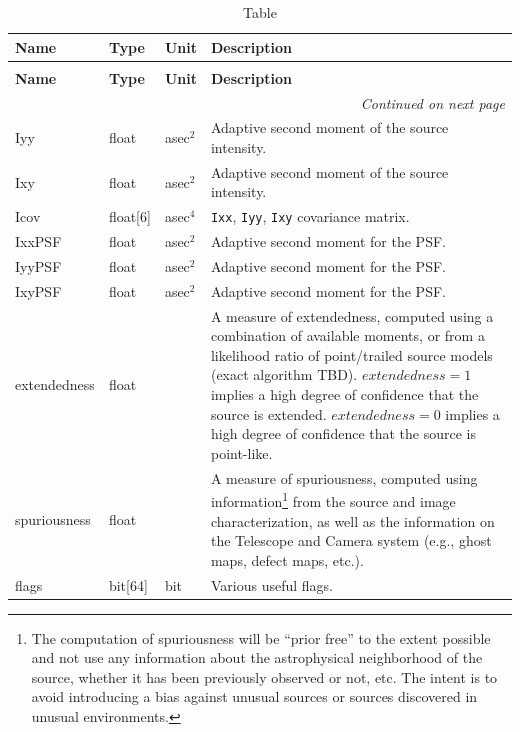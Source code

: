 \documentclass[SE,lsstdraft,toc]{lsstdoc}
\newenvironment{schema}[3]{%
\setlength\LTleft{0pt}
\setlength\LTright{\fill}
\begin{longtable}{p{0.2\textwidth}p{0.14\textwidth}p{0.14\textwidth}p{0.41\textwidth}}

\caption[#1]{#2\label{#3}}\\

\hline \textbf{Name} & \textbf{Type} & \textbf{Unit} & \textbf{Description}\\ \hline
\endfirsthead

\caption[#1]{#2}\\

\hline \textbf{Name} & \textbf{Type} & \textbf{Unit} & \textbf{Description}\\ \hline
\endhead

\hline \multicolumn{4}{r}{\emph{Continued on next page}} \\
\endfoot

\hline\hline
\endlastfoot
}{%
\hline
\end{longtable}
}
\begin{document}
\begin{schema}{\DIASource Table}{\DIASource Table}{tbl:diasourceTable}
Iyy & float & asec$^{2}$ & Adaptive second moment of the source intensity. \\

Ixy & float & asec$^{2}$ & Adaptive second moment of the source intensity. \\

Icov & float[6] & asec$^{4}$ & \texttt{Ixx}, \texttt{Iyy}, \texttt{Ixy} covariance matrix. \\

IxxPSF & float & asec$^{2}$ & Adaptive second moment for the PSF. \\

IyyPSF & float & asec$^{2}$ & Adaptive second moment for the PSF. \\

IxyPSF & float & asec$^{2}$ & Adaptive second moment for the PSF. \\

extendedness & float & ~ & A measure of extendedness, computed using a combination of available moments, or from a likelihood ratio of point/trailed source models (exact algorithm TBD). $extendedness=1$ implies a high degree of confidence that the source is extended. $extendedness=0$ implies a high degree of confidence that the source is point-like. \\

spuriousness & float & ~ & A measure of spuriousness, computed using information\footnote{The computation
of spuriousness will be “prior free” to the extent possible and not use any information about the astrophysical neighborhood of the source, whether it has been previously observed or not, etc. The intent is to avoid introducing
a bias against unusual sources or sources discovered in unusual environments.}
from the source and image characterization, as well as the information on the Telescope and Camera system
(e.g., ghost maps, defect maps, etc.).
\\

flags & bit[64] & bit & Various useful flags.  \\
\end{schema}
\end{document}
